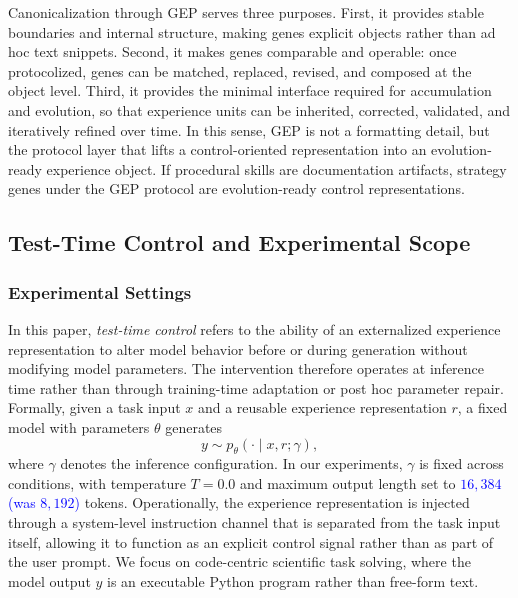 \documentclass{article}
\newcommand{\blue}[1]{\textcolor{blue}{#1}}
\begin{document}
Canonicalization through GEP serves three purposes. 
First, it provides stable boundaries and internal structure, making genes explicit objects rather than ad hoc text snippets. 
Second, it makes genes comparable and operable: once protocolized, genes can be matched, replaced, revised, and composed at the object level. 
Third, it provides the minimal interface required for accumulation and evolution, so that experience units can be inherited, corrected, validated, and iteratively refined over time. 
In this sense, GEP is not a formatting detail, but the protocol layer that lifts a control-oriented representation into an evolution-ready experience object. 
If procedural skills are documentation artifacts, strategy genes under the GEP protocol are evolution-ready control representations.



\subsection{Test-Time Control and Experimental Scope}
\label{sec:ttc_scope}

\subsubsection{Experimental Settings}

In this paper, \emph{test-time control} refers to the ability of an externalized experience representation to alter model behavior before or during generation without modifying model parameters. 
The intervention therefore operates at inference time rather than through training-time adaptation or post hoc parameter repair. 
Formally, given a task input $x$ and a reusable experience representation $r$, a fixed model with parameters $\theta$ generates
\begin{equation}
y \sim p_{\theta}(\cdot \mid x, r; \gamma),
\end{equation}
where $\gamma$ denotes the inference configuration. 
In our experiments, $\gamma$ is fixed across conditions, with temperature $T=0.0$ and maximum output length set to \blue{$16,384$ (was $8,192$)} tokens. 
Operationally, the experience representation is injected through a system-level instruction channel that is separated from the task input itself, allowing it to function as an explicit control signal rather than as part of the user prompt.
We focus on code-centric scientific task solving, where the model output $y$ is an executable Python program rather than free-form text. 
\end{document}
